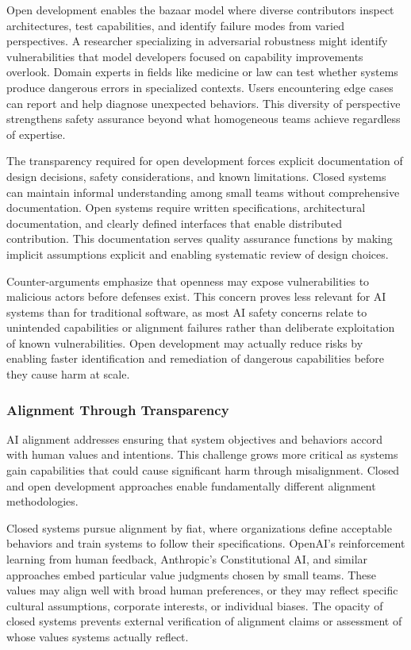 Open development enables the bazaar model where diverse contributors inspect architectures, test capabilities, and identify failure modes from varied perspectives. A researcher specializing in adversarial robustness might identify vulnerabilities that model developers focused on capability improvements overlook. Domain experts in fields like medicine or law can test whether systems produce dangerous errors in specialized contexts. Users encountering edge cases can report and help diagnose unexpected behaviors. This diversity of perspective strengthens safety assurance beyond what homogeneous teams achieve regardless of expertise.

The transparency required for open development forces explicit documentation of design decisions, safety considerations, and known limitations. Closed systems can maintain informal understanding among small teams without comprehensive documentation. Open systems require written specifications, architectural documentation, and clearly defined interfaces that enable distributed contribution. This documentation serves quality assurance functions by making implicit assumptions explicit and enabling systematic review of design choices.

Counter-arguments emphasize that openness may expose vulnerabilities to malicious actors before defenses exist. This concern proves less relevant for AI systems than for traditional software, as most AI safety concerns relate to unintended capabilities or alignment failures rather than deliberate exploitation of known vulnerabilities. Open development may actually reduce risks by enabling faster identification and remediation of dangerous capabilities before they cause harm at scale.

\subsubsection{Alignment Through Transparency}

AI alignment addresses ensuring that system objectives and behaviors accord with human values and intentions. This challenge grows more critical as systems gain capabilities that could cause significant harm through misalignment. Closed and open development approaches enable fundamentally different alignment methodologies.

Closed systems pursue alignment by fiat, where organizations define acceptable behaviors and train systems to follow their specifications. OpenAI's reinforcement learning from human feedback, Anthropic's Constitutional AI, and similar approaches embed particular value judgments chosen by small teams. These values may align well with broad human preferences, or they may reflect specific cultural assumptions, corporate interests, or individual biases. The opacity of closed systems prevents external verification of alignment claims or assessment of whose values systems actually reflect.

